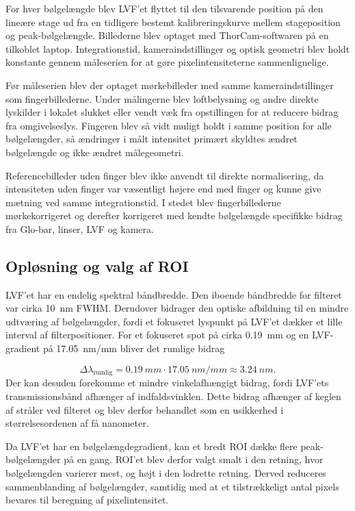 For hver bølgelængde blev LVF'et flyttet til den tilsvarende position på den lineære stage ud fra en tidligere bestemt kalibreringskurve mellem stageposition og peak-bølgelængde. Billederne blev optaget med ThorCam-softwaren på en tilkoblet laptop. Integrationstid, kameraindstillinger og optisk geometri blev holdt konstante gennem måleserien for at gøre pixelintensiteterne sammenlignelige.

Før måleserien blev der optaget mørkebilleder med samme kameraindstillinger som fingerbillederne. Under målingerne blev loftbelysning og andre direkte lyskilder i lokalet slukket eller vendt væk fra opstillingen for at reducere bidrag fra omgivelseslys. Fingeren blev så vidt muligt holdt i samme position for alle bølgelængder, så ændringer i målt intensitet primært skyldtes ændret bølgelængde og ikke ændret målegeometri.

Referencebilleder uden finger blev ikke anvendt til direkte normalisering, da intensiteten uden finger var væsentligt højere end med finger og kunne give mætning ved samme integrationstid. I stedet blev fingerbillederne mørkekorrigeret og derefter korrigeret med kendte bølgelængde specifikke bidrag fra Glo-bar, linser, LVF og kamera.

\subsection{Opløsning og valg af ROI}
\label{resolution_ROI}
LVF'et har en endelig spektral båndbredde. Den iboende båndbredde for filteret var cirka \SI{10}{nm} FWHM. Derudover bidrager den optiske afbildning til en mindre udtværing af bølgelængder, fordi et fokuseret lyspunkt på LVF'et dækker et lille interval af filterpositioner. For et fokuseret spot på cirka \SI{0.19}{mm} og en LVF-gradient på \SI{17.05}{nm/mm} bliver det rumlige bidrag

\begin{equation}
    \Delta \lambda_{\mathrm{rumlig}}
    =
    \SI{0.19}{mm}
    \cdot
    \SI{17.05}{nm/mm}
    \approx
    \SI{3.24}{nm}.
\end{equation}
Der kan desuden forekomme et mindre vinkelafhængigt bidrag, fordi LVF'ets transmissionsbånd afhænger af indfaldsvinklen. Dette bidrag afhænger af keglen af stråler ved filteret og blev derfor behandlet som en usikkerhed i størrelsesordenen af få nanometer.

Da LVF'et har en bølgelængdegradient, kan et bredt ROI dække flere peak-bølgelængder på en gang. ROI'et blev derfor valgt smalt i den retning, hvor bølgelængden varierer mest, og højt i den lodrette retning. Derved reduceres sammenblanding af bølgelængder, samtidig med at et tilstrækkeligt antal pixels bevares til beregning af pixelintensitet.

